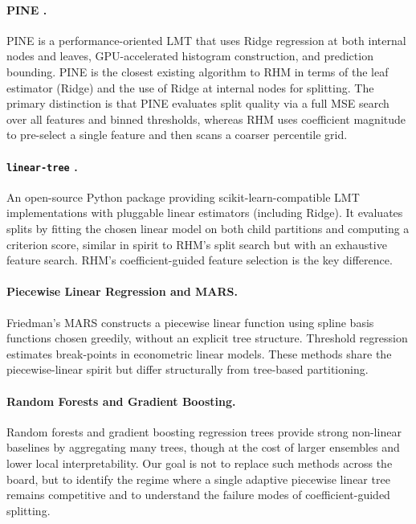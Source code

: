 \documentclass[11pt,a4paper]{article}
\begin{document}
\paragraph{PINE \citep{li2024}.} PINE is a performance-oriented LMT that uses Ridge regression at both internal nodes and leaves, GPU-accelerated histogram construction, and prediction bounding. PINE is the closest existing algorithm to RHM in terms of the leaf estimator (Ridge) and the use of Ridge at internal nodes for splitting. The primary distinction is that PINE evaluates split quality via a full MSE search over all features and binned thresholds, whereas RHM uses coefficient magnitude to pre-select a single feature and then scans a coarser percentile grid.

\paragraph{\texttt{linear-tree} \citep{cerlymarco2021}.} An open-source Python package providing scikit-learn-compatible LMT implementations with pluggable linear estimators (including Ridge). It evaluates splits by fitting the chosen linear model on both child partitions and computing a criterion score, similar in spirit to RHM's split search but with an exhaustive feature search. RHM's coefficient-guided feature selection is the key difference.

\paragraph{Piecewise Linear Regression and MARS.} Friedman's MARS \citep{friedman1991} constructs a piecewise linear function using spline basis functions chosen greedily, without an explicit tree structure. Threshold regression \citep{hansen2000} estimates break-points in econometric linear models. These methods share the piecewise-linear spirit but differ structurally from tree-based partitioning.

\paragraph{Random Forests and Gradient Boosting.} Random forests \citep{breiman2001rf} and gradient boosting regression trees \citep{friedman2001gbm} provide strong non-linear baselines by aggregating many trees, though at the cost of larger ensembles and lower local interpretability. Our goal is not to replace such methods across the board, but to identify the regime where a single adaptive piecewise linear tree remains competitive and to understand the failure modes of coefficient-guided splitting.
\end{document}
